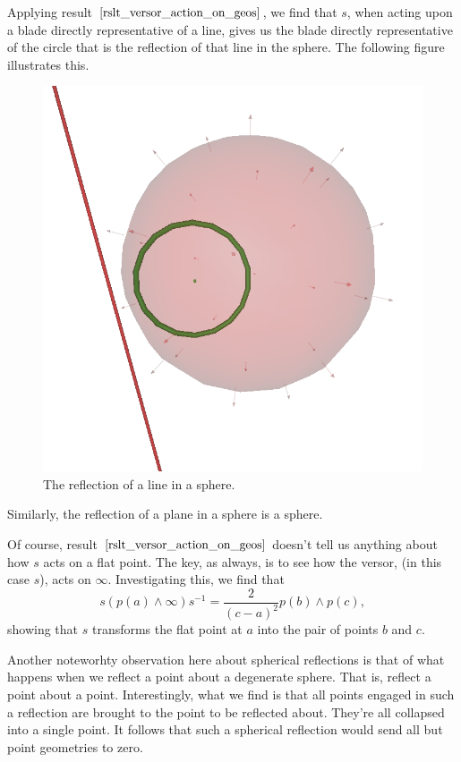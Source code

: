 \documentclass[12pt]{article}
\newcommand{\nvai}{\infty}
\begin{document}
Applying result $\eqref{rslt_versor_action_on_geos}$, we find that $s$, when
acting upon a blade directly representative of a line, gives us the blade directly
representative of the circle that is the reflection of that line in the sphere.
The following figure illustrates this.
\begin{figure}[H]
\centering
\includegraphics[scale=0.3]{ReflectionOfLineInSphereFigure}
\caption{The reflection of a line in a sphere.}
\end{figure}
Similarly, the reflection of a plane in a sphere is a sphere.

Of course, result $\eqref{rslt_versor_action_on_geos}$ doesn't tell us anything about
how $s$ acts on a flat point.  The key, as always, is to see how the versor, (in this case $s$), acts on $\nvai$.
Investigating this, we find that
\begin{equation*}
s(p(a)\wedge\nvai)s^{-1} = \frac{2}{(c-a)^2}p(b)\wedge p(c),
\end{equation*}
showing that $s$ transforms the flat point at $a$ into the pair of points $b$ and $c$.

Another noteworhty observation here about spherical reflections is that
of what happens when we reflect a point about a degenerate sphere.
That is, reflect a point about a point.  Interestingly, what we find is that
all points engaged in such a reflection are brought to the point to be
reflected about.  They're all collapsed into a single point.  It follows that
such a spherical reflection would send all but point geometries to zero.
\end{document}
